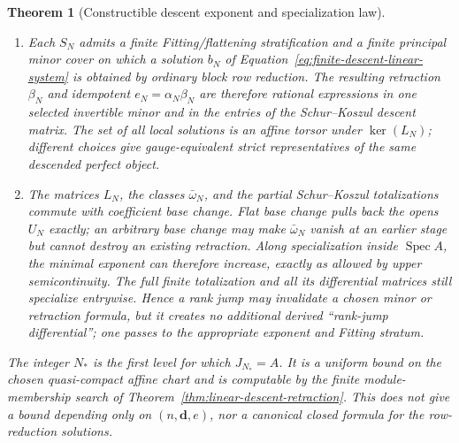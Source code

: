 \documentclass[11pt]{article}
\newtheorem{theorem}{Theorem}[section]
\theoremstyle{definition}
\begin{document}
\begin{theorem}[Constructible descent exponent and specialization law]
\begin{enumerate}[label=\textnormal{(\roman*)}]
\item Each $S_N$ admits a finite Fitting/flattening stratification and a finite
principal minor cover on which a solution $b_N$ of
Equation~\eqref{eq:finite-descent-linear-system} is obtained by ordinary block
row reduction.  The resulting retraction $\beta_N$ and idempotent
$e_N=\alpha_N\beta_N$ are therefore rational expressions in one selected
invertible minor and in the entries of the Schur--Koszul descent matrix.
The set of all local solutions is an affine torsor under
$\ker(L_N)$; different choices give gauge-equivalent strict representatives
of the same descended perfect object.

\item The matrices $L_N$, the classes $\bar\omega_N$, and the partial
Schur--Koszul totalizations commute with coefficient base change.  Flat base
change pulls back the opens $U_N$ exactly; an arbitrary base change may make
$\bar\omega_N$ vanish at an earlier stage but cannot destroy an existing
retraction.  Along specialization inside $\operatorname{Spec}A$, the minimal
exponent can therefore increase, exactly as allowed by upper
semicontinuity.  The full finite totalization and all its differential matrices
still specialize entrywise.  Hence a rank jump may invalidate a chosen
minor or retraction formula, but it creates no additional derived
``rank-jump differential''; one passes to the appropriate exponent and
Fitting stratum.
\end{enumerate}

The integer $N_*$ is the first level for which $J_{N_*}=A$.  It is a uniform
bound on the chosen quasi-compact affine chart and is computable by the
finite module-membership search of Theorem~\ref{thm:linear-descent-retraction}.
This does not give a bound depending only on $(n,\mathbf d,e)$, nor a canonical
closed formula for the row-reduction solutions.
\end{theorem}
\end{document}
